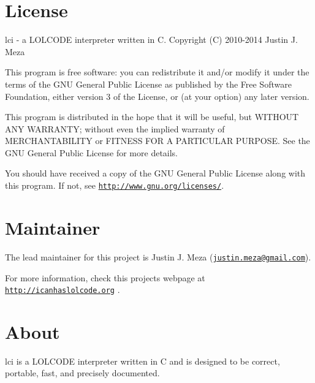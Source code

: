 \hypertarget{index_license}{}\section{License}\label{index_license}
lci -\/ a L\+O\+L\+C\+O\+DE interpreter written in C. Copyright (C) 2010-\/2014 Justin J. Meza

This program is free software\+: you can redistribute it and/or modify it under the terms of the G\+NU General Public License as published by the Free Software Foundation, either version 3 of the License, or (at your option) any later version.

This program is distributed in the hope that it will be useful, but W\+I\+T\+H\+O\+UT A\+NY W\+A\+R\+R\+A\+N\+TY; without even the implied warranty of M\+E\+R\+C\+H\+A\+N\+T\+A\+B\+I\+L\+I\+TY or F\+I\+T\+N\+E\+SS F\+OR A P\+A\+R\+T\+I\+C\+U\+L\+AR P\+U\+R\+P\+O\+SE. See the G\+NU General Public License for more details.

You should have received a copy of the G\+NU General Public License along with this program. If not, see \href{http://www.gnu.org/licenses/}{\tt http\+://www.\+gnu.\+org/licenses/}.\hypertarget{index_maintainer}{}\section{Maintainer}\label{index_maintainer}

\begin{DoxyItemize}
\item The lead maintainer for this project is Justin J. Meza (\href{mailto:justin.meza@gmail.com}{\tt justin.\+meza@gmail.\+com}).
\item For more information, check this project\textquotesingle{}s webpage at \href{http://icanhaslolcode.org}{\tt http\+://icanhaslolcode.\+org} .
\end{DoxyItemize}\hypertarget{index_about}{}\section{About}\label{index_about}
lci is a L\+O\+L\+C\+O\+DE interpreter written in C and is designed to be correct, portable, fast, and precisely documented.



